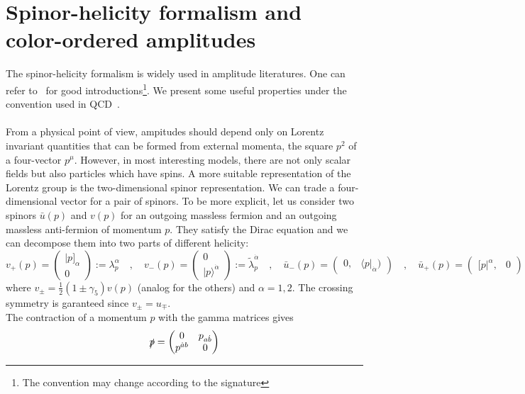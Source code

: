 \section{Spinor-helicity formalism and color-ordered amplitudes}\label{sect-spinor}
The spinor-helicity formalism is widely used in amplitude literatures. 
One can refer to~\cite{Dixon:1996wi,Elvang:2013cua} for good introductions\footnote{The convention may change according to the signature}.
We present some useful properties under the convention used in QCD~\cite{Dixon:1996wi}.
\\\\
From a physical point of view, ampitudes should depend only on Lorentz invariant quantities that can be formed from external momenta, \eg the square $p^2$ of a four-vector $p^\mu$.
However, in most interesting models, there are not only scalar fields but also particles which have spins. 
A more suitable representation of the Lorentz group is the two-dimensional spinor representation.
We can trade a four-dimensional vector for a pair of spinors.
To be more explicit, let us consider two spinors $\bar{u}(p)$ and $v(p)$ for an outgoing massless fermion and an outgoing massless anti-fermion of momentum $p$.
They satisfy the Dirac equation and we can decompose them into two parts of different helicity:
\begin{equation*}
v_+(p) = \begin{pmatrix}
|p]_\alpha \\ 0
\end{pmatrix} := \lambda_p^\alpha
\quad,\quad
v_-(p) = \begin{pmatrix}
0 \\ |p\rangle^{\dot{\alpha}}
\end{pmatrix} := \tilde{\lambda}_p^{\dot{\alpha}}
\quad,\quad
\bar{u}_-(p) = \begin{pmatrix} 
0, & \langle p |_{\dot{\alpha}})\end{pmatrix}
\quad,\quad
\bar{u}_+(p) = \begin{pmatrix} [ p|^\alpha, & 0 \end{pmatrix}
\end{equation*} 
where $v_\pm = \frac{1}{2}(1\pm\gamma_5)v(p)$ (analog for the others) and $\alpha = 1,2$.
The crossing symmetry is garanteed since $v_\pm = u_\mp$.
\\
The contraction of a momentum $p$ with the gamma matrices gives
\begin{equation}\label{slashedp}
\slashed{p} = \begin{pmatrix}
0 & p_{a\dot{b}} \\ 
p^{\dot{a}b} & 0
\end{pmatrix}
\end{equation}

